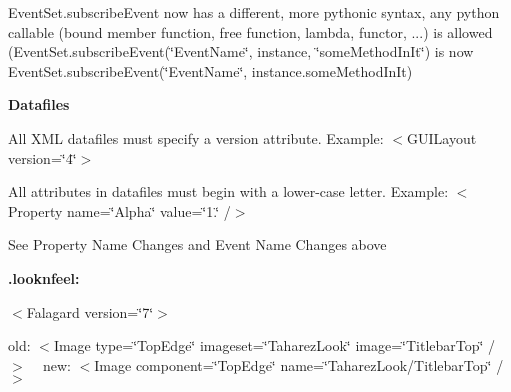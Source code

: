 \begin{DoxyItemize}
\item Event\+Set.\+subscribe\+Event now has a different, more pythonic syntax, any python callable (bound member function, free function, lambda, functor, ...) is allowed (Event\+Set.\+subscribe\+Event(\char`\"{}\+Event\+Name\char`\"{}, instance, \char`\"{}some\+Method\+In\+It\char`\"{}) is now Event\+Set.\+subscribe\+Event(\char`\"{}\+Event\+Name\char`\"{}, instance.\+some\+Method\+In\+It)

{\bfseries{ Datafiles }}
\item All X\+ML datafiles must specify a version attribute. Example\+: $<$G\+U\+I\+Layout \textquotesingle{}\textquotesingle{}\textquotesingle{}version=\char`\"{}4\char`\"{}\textquotesingle{}\textquotesingle{}\textquotesingle{}$>$
\item All attributes in datafiles must begin with a lower-\/case letter. Example\+: $<$Property \textquotesingle{}\textquotesingle{}\textquotesingle{}n\textquotesingle{}\textquotesingle{}\textquotesingle{}ame=\char`\"{}\+Alpha\char`\"{} \textquotesingle{}\textquotesingle{}\textquotesingle{}v\textquotesingle{}\textquotesingle{}\textquotesingle{}alue=\char`\"{}1.\char`\"{} /$>$
\item See \textquotesingle{}\textquotesingle{}\textquotesingle{}Property Name Changes\textquotesingle{}\textquotesingle{}\textquotesingle{} and \textquotesingle{}\textquotesingle{}\textquotesingle{}Event Name Changes\textquotesingle{}\textquotesingle{}\textquotesingle{} above
\item {\bfseries{.looknfeel\+:}}
\begin{DoxyItemize}
\item $<$\+Falagard version=\char`\"{}7\char`\"{}$>$
\item old\+: $<$Image \textquotesingle{}\textquotesingle{}\textquotesingle{}type\textquotesingle{}\textquotesingle{}\textquotesingle{}=\char`\"{}\+Top\+Edge\char`\"{} \textquotesingle{}\textquotesingle{}\textquotesingle{}imageset\textquotesingle{}\textquotesingle{}\textquotesingle{}=\char`\"{}\+Taharez\+Look\char`\"{} \textquotesingle{}\textquotesingle{}\textquotesingle{}image\textquotesingle{}\textquotesingle{}\textquotesingle{}=\char`\"{}\+Titlebar\+Top\char`\"{} /$>$ ~\newline
new\+: $<$Image \textquotesingle{}\textquotesingle{}\textquotesingle{}component\textquotesingle{}\textquotesingle{}\textquotesingle{}=\char`\"{}\+Top\+Edge\char`\"{} \textquotesingle{}\textquotesingle{}\textquotesingle{}name\textquotesingle{}\textquotesingle{}\textquotesingle{}=\char`\"{}\+Taharez\+Look/\+Titlebar\+Top\char`\"{} /$>$

\end{DoxyItemize}
\end{DoxyItemize}
